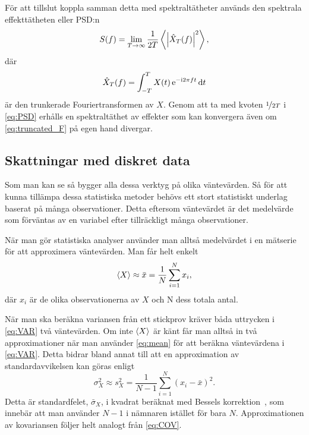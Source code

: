 För att tillslut koppla samman detta med spektraltätheter används den spektrala effekttätheten eller PSD:n
\begin{equation}\label{eq:PSD}
S(f) =  \lim_{T\to\infty}\dfrac{1}{2T} \ev{\abs{\hat{X}_T(f)}^2},
\end{equation} 
där
\begin{equation}\label{eq:truncated_F}
\hat{X}_T(f) = \int_{-T}^{T} X(t)\,\mathrm{e}^{-\mathrm{i} 2\pi f t} \,\mathrm{d}{t}
\end{equation}
är den trunkerade Fouriertransformen av $X$. Genom att ta med kvoten $\nicefrac{1}{2T}$ i \eqref{eq:PSD} erhålls en spektraltäthet av effekter som kan konvergera även om \eqref{eq:truncated_F} på egen hand divergar. 


\subsection{Skattningar med diskret data} \label{sec:diskret_data}
Som man kan se så bygger alla dessa 
verktyg på olika väntevärden. Så för att kunna tillämpa
dessa statistiska metoder behövs ett stort statistiskt underlag baserat på
många observationer. Detta eftersom väntevärdet är det medelvärde
som förväntas av en variabel efter tillräckligt många observationer.

När man gör statistiska analyser använder man alltså medelvärdet i en
mätserie för att approximera väntevärden. Man får helt enkelt
\begin{equation}\label{eq:mean}
\ev{X} \approx \bar{x} = \frac{1}{N} \sum_{i=1}^N x_i,
\end{equation}
där $x_i$ är de olika observationerna av $X$ och N dess totala antal. 

När man ska beräkna variansen från ett stickprov kräver båda uttrycken
i \eqref{eq:VAR} två väntevärden. Om inte $\ev{X}$ är känt får man
alltså in två approximationer när man använder \eqref{eq:mean} för att
beräkna väntevärdena i \eqref{eq:VAR}. Detta bidrar bland annat till att en approximation av standardavvikelsen kan göras enligt
\begin{equation}
\sigma_X^2 \approx s_X^2
=  \frac{1}{N-1} \sum_{i=1}^N \left(x_i-\bar{x}\right)^2.
\end{equation}
Detta är standardfelet, $\bar{\sigma}_X$, i kvadrat beräknat med
Bessels korrektion~\cite{Rice_matstat2006}, som innebär att man använder ${N-1}$
i nämnaren istället för bara $N$. Approximationen av kovariansen
följer helt analogt från \eqref{eq:COV}.

